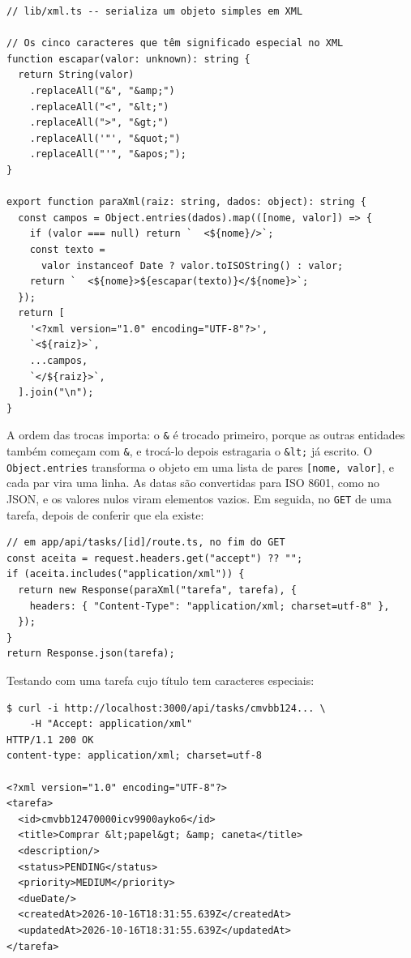 \begin{codigo}
\begin{Verbatim}[breaklines=true, breaksymbolleft={}, fontsize=\footnotesize]
// lib/xml.ts -- serializa um objeto simples em XML

// Os cinco caracteres que têm significado especial no XML
function escapar(valor: unknown): string {
  return String(valor)
    .replaceAll("&", "&amp;")
    .replaceAll("<", "&lt;")
    .replaceAll(">", "&gt;")
    .replaceAll('"', "&quot;")
    .replaceAll("'", "&apos;");
}

export function paraXml(raiz: string, dados: object): string {
  const campos = Object.entries(dados).map(([nome, valor]) => {
    if (valor === null) return `  <${nome}/>`;
    const texto =
      valor instanceof Date ? valor.toISOString() : valor;
    return `  <${nome}>${escapar(texto)}</${nome}>`;
  });
  return [
    '<?xml version="1.0" encoding="UTF-8"?>',
    `<${raiz}>`,
    ...campos,
    `</${raiz}>`,
  ].join("\n");
}
\end{Verbatim}
\end{codigo}

A ordem das trocas importa: o \texttt{\&} é trocado primeiro, porque as outras entidades também começam com \texttt{\&}, e trocá-lo depois estragaria o \texttt{\&lt;} já escrito. O \texttt{Object.entries} transforma o objeto em uma lista de pares \texttt{[nome, valor]}, e cada par vira uma linha. As datas são convertidas para ISO 8601, como no JSON, e os valores nulos viram elementos vazios. Em seguida, no \texttt{GET} de uma tarefa, depois de conferir que ela existe:

\begin{codigo}
\begin{Verbatim}[breaklines=true, breaksymbolleft={}, fontsize=\footnotesize]
// em app/api/tasks/[id]/route.ts, no fim do GET
const aceita = request.headers.get("accept") ?? "";
if (aceita.includes("application/xml")) {
  return new Response(paraXml("tarefa", tarefa), {
    headers: { "Content-Type": "application/xml; charset=utf-8" },
  });
}
return Response.json(tarefa);
\end{Verbatim}
\end{codigo}

Testando com uma tarefa cujo título tem caracteres especiais:

\begin{codigo}
\begin{Verbatim}[breaklines=true, breaksymbolleft={}, fontsize=\footnotesize]
$ curl -i http://localhost:3000/api/tasks/cmvbb124... \
    -H "Accept: application/xml"
HTTP/1.1 200 OK
content-type: application/xml; charset=utf-8

<?xml version="1.0" encoding="UTF-8"?>
<tarefa>
  <id>cmvbb12470000icv9900ayko6</id>
  <title>Comprar &lt;papel&gt; &amp; caneta</title>
  <description/>
  <status>PENDING</status>
  <priority>MEDIUM</priority>
  <dueDate/>
  <createdAt>2026-10-16T18:31:55.639Z</createdAt>
  <updatedAt>2026-10-16T18:31:55.639Z</updatedAt>
</tarefa>
\end{Verbatim}
\end{codigo}

